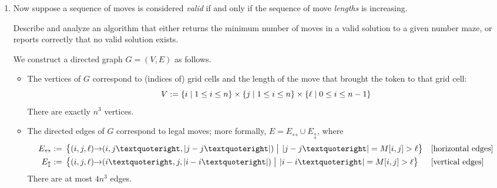 \documentclass[11pt]{article}
\begin{document}
\begin{enumerate}
\begin{Solution}
\begin{itemize}
\item
The vertices and edges do not have associated values.

\item
Any valid sequence of $\ell$ legal moves in $M$ corresponds to a directed path in $G’$ with length $\ell$.  For example, the 4-move sequence $(1,1) \arcto (3,1) \arcto (3,7) \arcto (4,7) \arcto (4,4)$ corresponds to the directed path
\[
	(1,1)\arcTo
	((1,1)\arcto(3,1))\arcTo
	((3,1)\arcto(3,7))\arcTo
	((3,7)\arcto(4,7))\arcTo
	((4,7)\arcto(4,4)),
\]
which has length $4$. Thus, the shortest valid sequence of legal moves from $(1,1)$ to $(n,n)$ corresponds to the shortest path in $G$ from the start vertex $(1,1)$ to any vertex of the form $u\arcto(n,n)$.

\item
We can compute this shortest path using breadth-first search.  Specifically, we compute shortest path in $G’$ from $(1,1)$ to every other vertex in $V’$ using breadth-first search, and then find the best last move $u\arcto(n,n)$ by comparing distances by brute force.

\item
Our algorithm runs in $O(V+E) =$ .

\end{itemize}
\end{Solution}


\newpage
\item
Now suppose a sequence of moves is considered \emph{valid} if and only if the sequence of move \emph{lengths} is increasing.

Describe and analyze an algorithm that either returns the minimum number of moves in a valid solution to a given number maze, or reports correctly that no valid solution exists.

\begin{Solution}
We construct a directed graph $G=(V,E)$ as follows.
\begin{itemize}
\item
The vertices of $G$ correspond to (indices of) grid cells and the length of the move that brought the token to that grid cell:
\[
	V := \{ i\mid 1\le i\le n \}
		\times \{ j\mid 1\le i\le n \}
		\times \{ \ell\mid 0\le i\le n-1 \}
\]
There are exactly $n^3$ vertices.

\item
The directed edges of $G$ correspond to legal moves; more formally, $E = E_\leftrightarrow \cup E_\updownarrow$, where
\begin{align*}
	E_\leftrightarrow := {}&
		\Setbar{(i,j,\ell)\arcto(i,j’,\abs{j-j’})\strut}
					{\abs{j-j’} = M[i,j] > \ell}
				&& \text{[horizontal edges]} \\
	E_\updownarrow := {}&
		 \Setbar{(i,j,\ell)\arcto(i’,j,\abs{i-i’})\strut}
		 			{\abs{i-i’} = M[i,j] > \ell}
				&& \text{[vertical edges]}
\end{align*}
There are at most $4n^3$ edges.


\end{itemize}
\end{Solution}
\end{enumerate}
\end{document}
